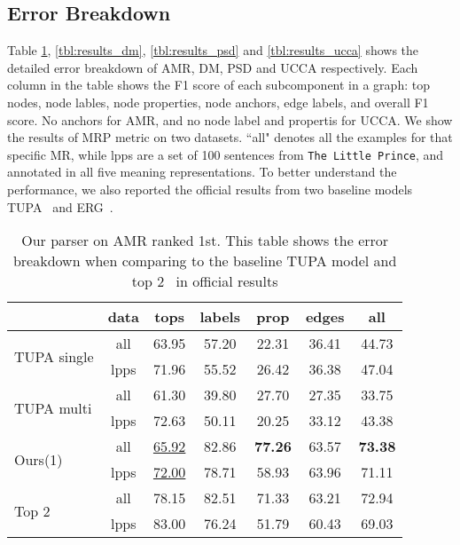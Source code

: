 \subsection{Error Breakdown}
\label{ssec:error_breakdown}
Table \ref{tbl:results_amr}, \ref{tbl:results_dm},
\ref{tbl:results_psd} and \ref{tbl:results_ucca} shows the detailed
error breakdown of AMR, DM, PSD and UCCA respectively. Each column in
the table shows the F1 score of each subcomponent in a graph: top
nodes, node lables, node properties, node anchors, edge labels, and
overall F1 score. No anchors for AMR, and no node label and propertis
for UCCA. We show the results of MRP metric on two datasets. ``all"
denotes all the examples for that specific MR, while lpps are a set of
100 sentences from \texttt{The Little Prince}, and annotated in all five
meaning representations. To better understand the performance, we also
reported the official results from two baseline models
TUPA~\cite{Her:Arv:19} and ERG~\cite{Oep:Fli:19}.

\begin{table}[!tbp]
\caption{\label{tbl:results_amr} Our parser on AMR ranked 1st. This table shows the error breakdown when comparing to the baseline TUPA model and top 2~\cite{Che:Dou:Xu:19} in official results}
\small
\centering
\setlength{\tabcolsep}{3pt}
\begin{tabular}{lcccccc}
\toprule
                          & data & tops              & labels & prop  & edges & all   \\ \hline
\multirow{2}{*}{ \parbox{1cm}{TUPA
single} }                 & all  & 63.95             & 57.20  & 22.31 & 36.41 & 44.73 \\
                          & lpps & 71.96             & 55.52  & 26.42 & 36.38 & 47.04 \\ \hline
\multirow{2}{*}{ \parbox{1cm}{TUPA
multi} }                  & all  & 61.30             & 39.80  & 27.70 & 27.35 & 33.75 \\
                          & lpps & 72.63             & 50.11  & 20.25 & 33.12 & 43.38 \\ \hline
\multirow{2}{*}{ Ours(1)} & all  & \underline{65.92} & 82.86  & {\bf 77.26} & 63.57 & {\bf 73.38} \\
                          & lpps & \underline{72.00} & 78.71  & 58.93 & 63.96 & 71.11 \\ \hline
\multirow{2}{*}{ Top 2}  & all  & 78.15             & 82.51  & 71.33 & 63.21 & 72.94 \\
                          & lpps & 83.00             & 76.24  & 51.79 & 60.43 & 69.03 \\ \bottomrule
\end{tabular}
\end{table}

